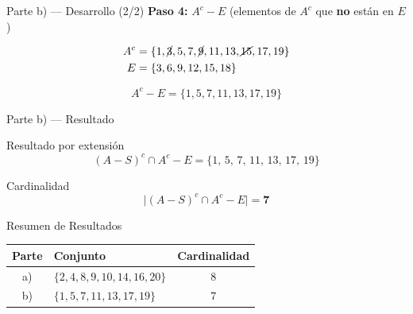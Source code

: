 \documentclass[11pt]{beamer}
\begin{document}
	\begin{frame}{Parte b) — Desarrollo (2/2)}
		\textbf{Paso 4:} $A^c - E$ (elementos de $A^c$ que \textbf{no} están en $E$)
		
		\begin{align*}
			A^c &= \{1, \cancel{3}, 5, 7, \cancel{9}, 11, 13, \cancel{15}, 17, 19\} \\
			E   &= \{3, 6, 9, 12, 15, 18\}
		\end{align*}
		
		\[
		A^c - E = \{1, 5, 7, 11, 13, 17, 19\}
		\]
	\end{frame}
	
	\begin{frame}{Parte b) — Resultado}
		\begin{exampleblock}{Resultado por extensión}
			\[
			(A-S)^c \cap A^c - E = \{1,\, 5,\, 7,\, 11,\, 13,\, 17,\, 19\}
			\]
		\end{exampleblock}
		
		\begin{block}{Cardinalidad}
			\[
			\bigl|(A-S)^c \cap A^c - E\bigr| = \mathbf{7}
			\]
		\end{block}
	\end{frame}
	
	\begin{frame}{Resumen de Resultados}
		\begin{center}
			\renewcommand{\arraystretch}{1.8}
			\begin{tabular}{|c|l|c|}
				\hline
				\textbf{Parte} & \textbf{Conjunto} & \textbf{Cardinalidad} \\
				\hline
				a) & $\{2, 4, 8, 9, 10, 14, 16, 20\}$ & $8$ \\
				\hline
				b) & $\{1, 5, 7, 11, 13, 17, 19\}$ & $7$ \\
				\hline
			\end{tabular}
		\end{center}
	\end{frame}
	
\end{document}
